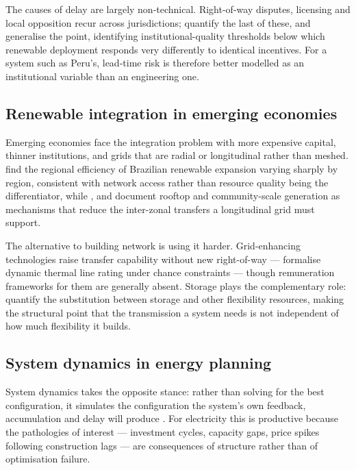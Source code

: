 The causes of delay are largely non-technical. Right-of-way disputes, licensing and
local opposition recur across jurisdictions; \citet{sun2026} quantify the last of
these, and \citet{boateng2026} generalise the point, identifying
institutional-quality thresholds below which renewable deployment responds very
differently to identical incentives. For a system such as Peru's, lead-time risk is
therefore better modelled as an institutional variable than an engineering one.

\subsection{Renewable integration in emerging economies}
\label{sec:lit:emerging}

Emerging economies face the integration problem with more expensive capital, thinner
institutions, and grids that are radial or longitudinal rather than meshed.
\citet{dasilva2025} find the regional efficiency of Brazilian renewable expansion
varying sharply by region, consistent with network access rather than resource quality
being the differentiator, while \citet{antoniolli2022}, \citet{wu2025} and
\citet{sheng2026} document rooftop and community-scale generation as mechanisms that
reduce the inter-zonal transfers a longitudinal grid must support.

The alternative to building network is using it harder. Grid-enhancing technologies
raise transfer capability without new right-of-way --- \citet{sadeghian2026} formalise
dynamic thermal line rating under chance constraints --- though remuneration
frameworks for them are generally absent. Storage plays the complementary role:
\citet{sousa2024} quantify the substitution between storage and other flexibility
resources, making the structural point that the transmission a system needs is not
independent of how much flexibility it builds.

\subsection{System dynamics in energy planning}
\label{sec:lit:sd}

System dynamics takes the opposite stance: rather than solving for the best
configuration, it simulates the configuration the system's own feedback, accumulation
and delay will produce \citep{forrester1997,sterman2000}. For electricity this is
productive because the pathologies of interest --- investment cycles, capacity gaps,
price spikes following construction lags --- are consequences of structure rather than
of optimisation failure.

